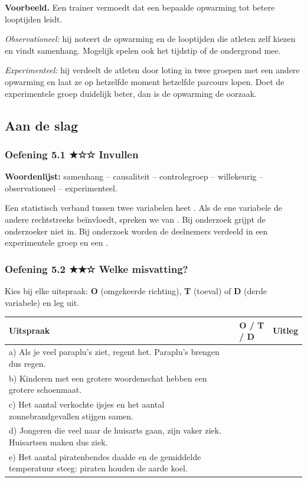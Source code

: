 \begin{voorbeeld}
\textbf{Voorbeeld.} Een trainer vermoedt dat een bepaalde opwarming tot betere looptijden leidt.

\emph{Observationeel:} hij noteert de opwarming en de looptijden die atleten zelf kiezen en vindt samenhang. Mogelijk spelen ook het tijdstip of de ondergrond mee.

\emph{Experimenteel:} hij verdeelt de atleten door loting in twee groepen met een andere opwarming en laat ze op hetzelfde moment hetzelfde parcours lopen. Doet de experimentele groep duidelijk beter, dan is de opwarming de oorzaak.
\end{voorbeeld}

\subsection*{Aan de slag}

\subsubsection*{Oefening 5.1 \quad ★☆☆ \quad Invullen}

\textbf{Woordenlijst:} samenhang – causaliteit – controlegroep – willekeurig – observationeel – experimenteel.

Een statistisch verband tussen twee variabelen heet . Als de ene variabele de andere rechtstreeks beïnvloedt, spreken we van . Bij  onderzoek grijpt de onderzoeker niet in. Bij  onderzoek worden de deelnemers  verdeeld in een experimentele groep en een .

\subsubsection*{Oefening 5.2 \quad ★★☆ \quad Welke misvatting?}

Kies bij elke uitspraak: \textbf{O} (omgekeerde richting), \textbf{T} (toeval) of \textbf{D} (derde variabele) en leg uit.

\begin{tabular}{lll}
\hline
Uitspraak & O / T / D & Uitleg \\
\hline
a) Als je veel paraplu’s ziet, regent het. Paraplu’s brengen dus regen. & & \\
b) Kinderen met een grotere woordenschat hebben een grotere schoenmaat. & & \\
c) Het aantal verkochte ijsjes en het aantal zonnebrandgevallen stijgen samen. & & \\
d) Jongeren die veel naar de huisarts gaan, zijn vaker ziek. Huisartsen maken dus ziek. & & \\
e) Het aantal piratenbendes daalde en de gemiddelde temperatuur steeg: piraten houden de aarde koel. & & \\
\hline
\end{tabular}

